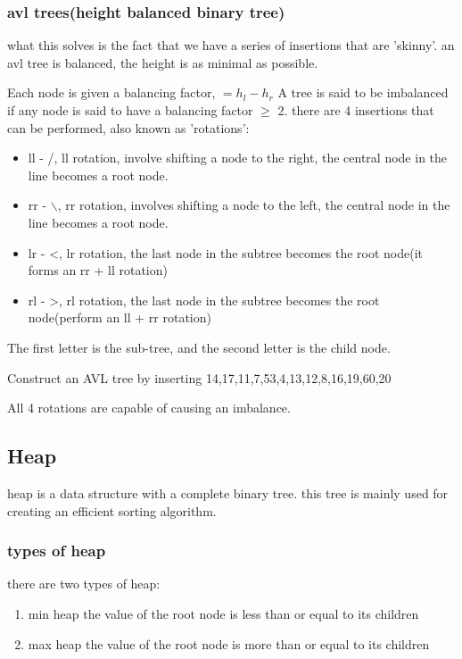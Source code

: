 \documentclass[11pt]{article}
\begin{document}
\subsubsection{avl trees(height balanced binary tree)}
\label{sec:org6d37b57}
what this solves is the fact that we have a series of insertions that are 'skinny'. an avl tree is balanced, the height is as minimal as possible.

Each node is given a balancing factor, \(= h_l-h_r\)
A tree is said to be imbalanced if any node is said to have a balancing factor \(\geq\) 2.
there are 4 insertions that can be performed, also known as 'rotations':
\begin{itemize}
\item ll - /, ll rotation, involve shifting a node to the right, the central node in the line becomes a root node.
\item rr - $\backslash$, rr rotation, involves shifting a node to the left, the central node in the line becomes a root node.
\item lr - <, lr rotation, the last node in the subtree becomes the root node(it forms an rr + ll rotation)
\item rl - >, rl rotation, the last node in the subtree becomes the root node(perform an ll + rr rotation)
\end{itemize}

The first letter is the sub-tree, and the second letter is the child node.

Construct an AVL tree by inserting 14,17,11,7,53,4,13,12,8,16,19,60,20

All 4 rotations are capable of causing an imbalance.
\subsection{Heap}
\label{sec:orgc7046d9}
heap is a data structure with a complete binary tree. this tree is mainly used for creating an efficient sorting algorithm.
\subsubsection{types of heap}
\label{sec:orgf12f42d}
there are two types of heap:
\begin{enumerate}
\item min heap
\label{sec:org434425f}
the value of the root node is less than or equal to  its children
\item max heap
\label{sec:org6f754d0}
the value of the root node is more than or equal to its children
\end{enumerate}
\end{document}
